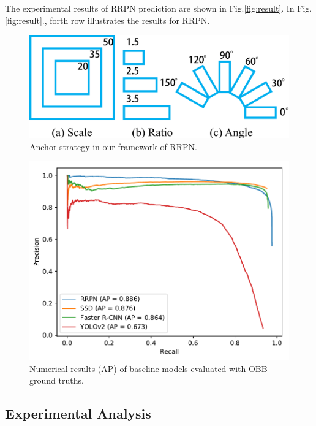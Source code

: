 The experimental results of RRPN prediction are shown in Fig.\ref{fig:result}. In Fig.\ref{fig:result}., forth row illustrates the results for RRPN.



\begin{figure}
	\includegraphics[width=\linewidth]{images/scale_ratio_angle.pdf}
	\caption{Anchor strategy in our framework of RRPN.}
	\label{fig:anchors}
\end{figure}

\begin{figure}
	\includegraphics[width=\linewidth]{images/pr_rbbox.pdf}
	\caption{Numerical results (AP) of baseline models evaluated with OBB ground truths.}
	\label{fig:pr_rbbox}
\end{figure}



\subsection{Experimental Analysis}


